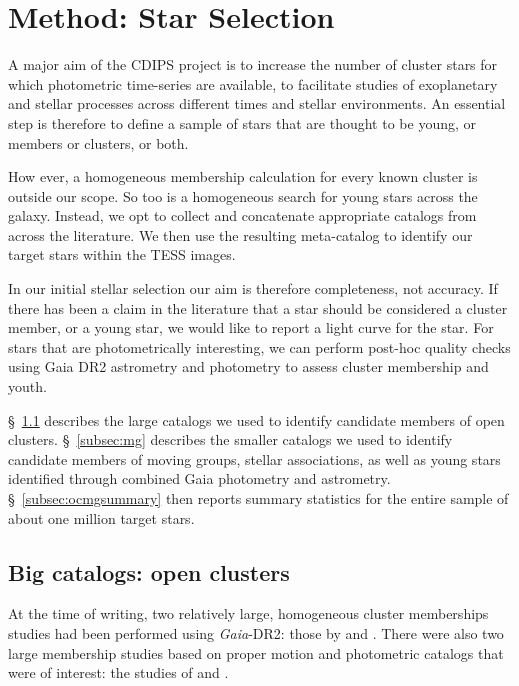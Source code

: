 \documentclass[12pt,twocolumn,tighten]{aastex62}
\begin{document}
\section{Method: Star Selection}
\label{sec:starselection}

A major aim of the CDIPS project is to increase the number of
cluster stars for which photometric time-series are
available, to facilitate studies of exoplanetary and stellar
processes across different times and stellar environments.
An essential step is therefore to define a sample of
stars that are thought to be young, or members or clusters, or both.

How
ever, a homogeneous membership calculation for every known
cluster is outside our scope.  So too is a homogeneous search for
young stars across the galaxy.
Instead, we opt to collect
and concatenate appropriate catalogs from across the literature.  
We then use the resulting meta-catalog to identify our target stars within the 
TESS images.

In our initial stellar selection our aim is therefore completeness, not 
accuracy.  If there has
been a claim in the literature that a star should be considered a
cluster member, or a young star, we would like to report a light curve for the 
star.
For stars that are photometrically interesting, we can perform post-hoc
quality checks using Gaia DR2 astrometry and photometry to assess cluster 
membership and youth.

\S~\ref{subsec:oc} describes the large catalogs we used to 
identify candidate members of open clusters.
\S~\ref{subsec:mg} describes the smaller catalogs we used to identify 
candidate members of moving groups, stellar associations, as well as young 
stars identified through combined Gaia photometry and astrometry.
\S~\ref{subsec:ocmgsummary} then reports summary statistics for the entire 
sample of about one million target stars.


\subsection{Big catalogs: open clusters}
\label{subsec:oc}

At the time of writing, two relatively large, homogeneous cluster
memberships studies had been performed using {\it Gaia}-DR2: those by
\citet{cantat-gaudin_gaia_2018} and \citet{gaia_hr_2018}.
There were also two large membership studies based on proper motion and 
photometric catalogs that were of interest: the studies of
\citet{Kharchenko_et_al_2013} and \citet{dias_proper_2014}.
\end{document}
